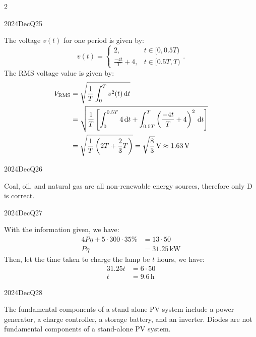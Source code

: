 \begin{multicols}{2}
\pagebreak

\begin{qsolution}{2024}{Dec}{Q25}{\tgEE \tgEEPowerSystems \tgEERMS}
    
    The voltage $v(t)$ for one period is given by:
    \[
        v(t) = \begin{cases}
            2, & t\in[0, 0.5T) \\
            \frac{-4t}{T}+4, & t\in[0.5T, T)
        \end{cases}.
    \]
    The RMS voltage value is given by:
    \begin{align*}
        V_{\mathrm{RMS}} &= \sqrt{\frac{1}{T}\int_0^{T} v^2(t) \,\mathrm{d} t} \\
        &= \sqrt{\frac{1}{T}\left[\int_0^{0.5T} 4 \,\mathrm{d} t + \int_{0.5T}^{T} \left(\frac{-4t}{T}+4\right)^2 \,\mathrm{d} t\right]} \\
        &= \sqrt{\frac{1}{T}\left(2T+\frac{2}{3}T\right)} = \sqrt{\frac{8}{3}}\,\mathrm{V} \approx 1.63 \,\mathrm{V}
    \end{align*}
\end{qsolution}

\begin{qsolution}{2024}{Dec}{Q26}{\tgEE \tgEERenewableEnergy}

    Coal, oil, and natural gas are all non-renewable energy sources, therefore only D is correct.
\end{qsolution}

\begin{qsolution}{2024}{Dec}{Q27}{\tgEE \tgEEPowerSystems}

    With the information given, we have:
    \begin{align*}
        4P\eta+5\cdot300\cdot35\%&=13\cdot50\\
        P\eta&=31.25\,\mathrm{kW}
    \end{align*}
    Then, let the time taken to charge the lamp be $t$ hours, we have:
    \begin{align*}
        31.25t&=6\cdot50\\
        t&=9.6\,\mathrm{h}
    \end{align*}
\end{qsolution}

\begin{qsolution}{2024}{Dec}{Q28}{\tgEE \tgEERenewableEnergy \tgEEPowerSystems}

    The fundamental components of a stand-alone PV system include a power generator, a charge controller, a storage battery, and an inverter.
    Diodes are not fundamental components of a stand-alone PV system.
\end{qsolution}


\end{multicols}
